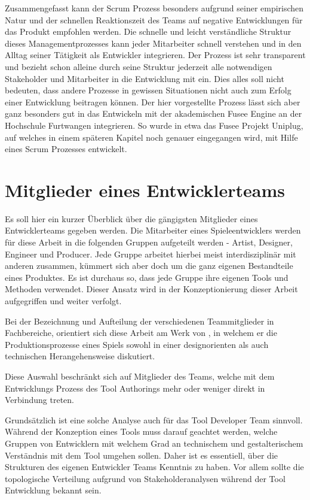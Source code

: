 \documentclass[pagesize, paper=a4, fontsize=12pt, titlepage=true, headings=small, headnosepline, abstractoff, liststotoc, nochapterprefix, plainheadsepline, twoside]{scrreprt}
\begin{document}
Zusammengefasst kann der Scrum Prozess besonders aufgrund seiner empirischen Natur und der schnellen Reaktionszeit des Teams auf negative Entwicklungen für das Produkt empfohlen werden. Die schnelle und leicht verständliche Struktur dieses Managementprozesses kann jeder Mitarbeiter schnell verstehen und in den Alltag seiner Tätigkeit als Entwickler integrieren. Der Prozess ist sehr transparent und bezieht schon alleine durch seine Struktur jederzeit alle notwendigen Stakeholder und Mitarbeiter in die Entwicklung mit ein. Dies alles soll nicht bedeuten, dass andere Prozesse in gewissen Situationen nicht auch zum Erfolg einer Entwicklung beitragen können. Der hier vorgestellte Prozess lässt sich aber ganz besonders gut in das Entwickeln mit der akademischen Fusee Engine an der Hochschule Furtwangen integrieren. So wurde in etwa das Fusee Projekt Uniplug, auf welches in einem späteren Kapitel noch genauer eingegangen wird, mit Hilfe eines Scrum Prozesses entwickelt. 

\section{Mitglieder eines Entwicklerteams}
Es soll hier ein kurzer Überblick über die gängigsten Mitglieder eines Entwicklerteams gegeben werden. Die Mitarbeiter eines Spieleentwicklers werden für diese Arbeit in die folgenden Gruppen aufgeteilt werden - Artist, Designer, Engineer und Producer. Jede Gruppe arbeitet hierbei meist interdisziplinär mit anderen zusammen, kümmert sich aber doch um die ganz eigenen Bestandteile eines Produktes. Es ist durchaus so, dass jede Gruppe ihre eigenen Tools und Methoden verwendet. Dieser Ansatz wird in der Konzeptionierung dieser Arbeit aufgegriffen und weiter verfolgt.

Bei der Bezeichnung und Aufteilung der verschiedenen Teammitglieder in Fachbereiche, orientiert sich diese Arbeit am Werk von , in welchem er die Produktionsprozesse eines Spiels sowohl in einer designorienten als auch technischen Herangehensweise diskutiert.

Diese Auswahl beschränkt sich auf Mitglieder des Teams, welche mit dem Entwicklungs Prozess des Tool Authorings mehr oder weniger direkt in Verbindung treten.

Grundsätzlich ist eine solche Analyse auch für das Tool Developer Team sinnvoll. Während der Konzeption eines Tools muss darauf geachtet werden, welche Gruppen von Entwicklern mit welchem Grad an technischem und gestalterischem Verständnis mit dem Tool umgehen sollen. Daher ist es essentiell, über die Strukturen des eigenen Entwickler Teams Kenntnis zu haben. Vor allem sollte die topologische Verteilung aufgrund von Stakeholderanalysen während der Tool Entwicklung bekannt sein. 
\end{document}
